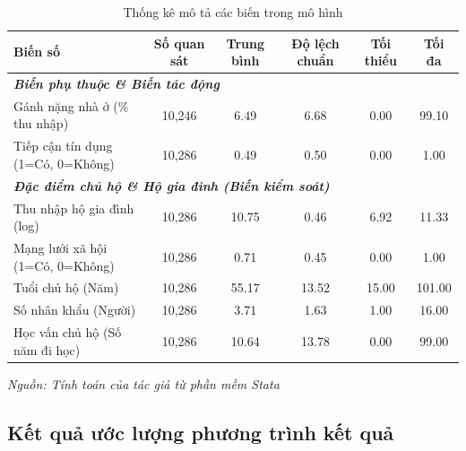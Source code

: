 \documentclass[12pt,a4paper]{report}
\begin{document}
\begin{table}[htbp]
	\centering
	\caption{Thống kê mô tả các biến trong mô hình}
	\label{tab:desc_stats}
	\vspace{0.2cm}
	\begin{tabular}{l c c c c c}
		\toprule
		\textbf{Biến số} & \textbf{Số quan sát} & \textbf{Trung bình} & \textbf{Độ lệch chuẩn} & \textbf{Tối thiểu} & \textbf{Tối đa} \\
		\midrule
		\multicolumn{6}{l}{\textit{\textbf{Biến phụ thuộc \& Biến tác động}}} \\
		Gánh nặng nhà ở (\% thu nhập) & 10,246 & 6.49 & 6.68 & 0.00 & 99.10 \\
		Tiếp cận tín dụng (1=Có, 0=Không) & 10,286 & 0.49 & 0.50 & 0.00 & 1.00 \\
		\midrule
		\multicolumn{6}{l}{\textit{\textbf{Đặc điểm chủ hộ \& Hộ gia đình (Biến kiểm soát)}}} \\
		Thu nhập hộ gia đình (log) & 10,286 & 10.75 & 0.46 & 6.92 & 11.33 \\
		Mạng lưới xã hội (1=Có, 0=Không) & 10,286 & 0.71 & 0.45 & 0.00 & 1.00 \\
		Tuổi chủ hộ (Năm) & 10,286 & 55.17 & 13.52 & 15.00 & 101.00 \\
		Số nhân khẩu (Người) & 10,286 & 3.71 & 1.63 & 1.00 & 16.00 \\
		Học vấn chủ hộ (Số năm đi học) & 10,286 & 10.64 & 13.78 & 0.00 & 99.00 \\
		\bottomrule
	\end{tabular}
	
	\vspace{0.2cm}
	\begin{flushleft}
		\footnotesize \textit{Nguồn: Tính toán của tác giả từ phần mềm Stata}
	\end{flushleft}
\end{table}

\subsection{Kết quả ước lượng phương trình kết quả}
\end{document}

